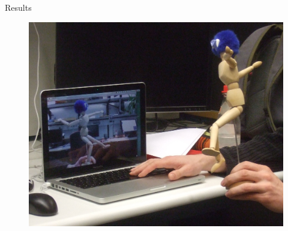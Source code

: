 \documentclass[final]{beamer}
\begin{document}
\begin{frame}{}
\begin{columns}[t]
\begin{column}{.48\linewidth}
\begin{block}{Results}
\begin{description}
\begin{figure}[htb]
	     					    \includegraphics[width=.6666\linewidth]{images/HS_2010-03-15_225559} \\
	     					\end{figure}


\end{description}
\end{block}
\end{column}
\end{columns}
\end{frame}
\end{document}
